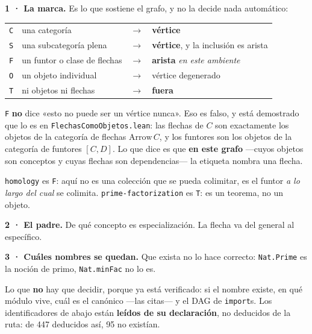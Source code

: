 \documentclass[10pt,a4paper]{article}
\begin{document}
\begin{marca}
\textbf{1 · La marca.} Es lo que sostiene el grafo, y no la decide nada automático:\par\smallskip
\begin{tabular}{@{}llll@{}}\toprule
\texttt{C} & una categoría & $\to$ & \textbf{vértice}\\
\texttt{S} & una subcategoría plena & $\to$ & \textbf{vértice}, y la inclusión es arista\\
\texttt{F} & un funtor o clase de flechas & $\to$ & \textbf{arista} \emph{en este ambiente}\\
\texttt{O} & un objeto individual & $\to$ & vértice degenerado\\
\texttt{T} & ni objetos ni flechas & $\to$ & \textbf{fuera}\\
\bottomrule\end{tabular}\par\smallskip
\begin{sloppypar}
\texttt{F} \textbf{no} dice «esto no puede ser un vértice nunca». Eso es falso, y está demostrado que lo es en \texttt{FlechasComoObjetos.lean}: las flechas de $C$ son exactamente los objetos de la categoría de flechas $\mathrm{Arrow}\,C$, y los funtores son los objetos de la categoría de funtores $[C,D]$. Lo que dice es que \textbf{en este grafo} —cuyos objetos son conceptos y cuyas flechas son dependencias— la etiqueta nombra una flecha.\end{sloppypar}\smallskip
\texttt{homology} es \texttt{F}: aquí no es una colección que se pueda colimitar, es el funtor \emph{a lo largo del cual} se colimita. \texttt{prime-factorization} es \texttt{T}: es un teorema, no un objeto.\par\medskip
\textbf{2 · El padre.} De qué concepto es especialización. La flecha va del general al específico.\par\medskip
\textbf{3 · Cuáles nombres se quedan.} Que exista no lo hace correcto: \texttt{Nat.Prime} es la noción de primo, \texttt{Nat.minFac} no lo es.
\end{marca}

\noindent Lo que \textbf{no} hay que decidir, porque ya está verificado: si el
nombre existe, en qué módulo vive, cuál es el canónico —las citas— y el DAG de
\texttt{import}s. Los identificadores de abajo están \textbf{leídos de su
declaración}, no deducidos de la ruta: de 447 deducidos así, 95 no existían.
\par\medskip

\begin{center}\small\begin{tabular}{@{}lr@{\quad}lr@{\quad}lr@{}}\toprule
\bottomrule\end{tabular}\end{center}
\end{document}
